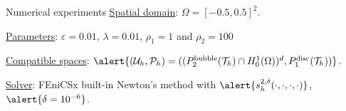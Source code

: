 \begin{frame}{Numerical experiments}
  \underline{Spatial domain}: $\Omega=[-0.5,0.5]^2$.

  \vspace*{1em}
  \underline{Parameters}: $\varepsilon=0.01$, $\lambda=0.01$, $\rho_1=1$ and $\rho_2=100$

  \vspace*{1em}
  \underline{Compatible
  spaces}: $\alert{(\Uh,\Ph)=((\Pb_2(\T_h)\cap H^1_0(\Omega))^d,\Pd_1(\T_h))}$.

  \vspace*{1em}
  \underline{Solver}: FEniCSx built-in Newton's method with $\alert{\shd{\cdot}{\cdot}{\cdot}{\cdot}}$, $\alert{\delta=10^{-6}}$.


\end{frame}



